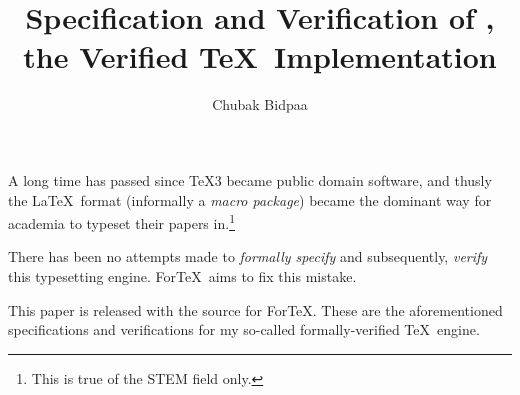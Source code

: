 \documentclass[a4paper]{article}
\title{Specification and Verification of \ForTeX, the Verified \TeX\ Implementation}
\author{Chubak Bidpaa}
\newcommand\ForTeX{ForTeX}
\begin{document}
\maketitle

A long time has passed since \TeX3 became public domain software, and thusly the \LaTeX\ format (informally a \textit{macro package}) became the dominant way for academia to typeset their papers in.\footnote{This is true of the STEM field only.}

There has been no attempts made to \textit{formally specify} and subsequently, \textit{verify} this typesetting engine. \ForTeX\ aims to fix this mistake.

This paper is released with the source for \ForTeX. These are the aforementioned specifications and verifications for my so-called formally-verified \TeX\ engine.
\end{document}
